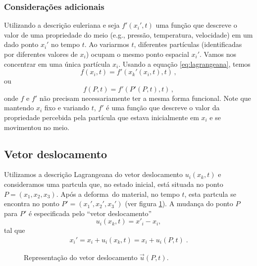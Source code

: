 \subsubsection{Considera\c{c}\~oes adicionais}
Utilizando a descri\c{c}\~ao euleriana e seja $f'(x_i',t)$ uma fun\c{c}\~ao que
descreve o valor de uma propriedade do meio (e.g., press\~ao, temperatura,
velocidade) em um dado ponto $x_i'$ no tempo $t$. Ao variarmos $t$,
diferentes part\'iculas (identificadas por diferentes valores de $x_i$) ocupam o
mesmo ponto espacial $x_i'$. Vamos nos concentrar em uma \'unica part\'icula
$x_i$. Usando a equa\c{c}\~ao \ref{eq:lagrangeana}, temos
\begin{equation}
  f(x_i,t) = f'(x_k'(x_i,t),t)\, ,
\end{equation}
ou
\begin{equation}
  f(P,t) = f'(P'(P,t),t)\, ,
\end{equation}
onde $f$ e $f'$ n\~ao precisam necessariamente ter a mesma forma funcional. Note
que mantendo $x_i$ fixo e variando $t$, $f'$ \'e uma fun\c{c}\~ao que descreve
o valor da propriedade percebida pela part\'icula que estava inicialmente em $x_i$
e se movimentou no meio.

\subsection{Vetor deslocamento}

Utilizamos a descri\c{c}\~ao Lagrangeana do 
vetor deslocamento $u_i(x_k,t)$ e consideramos uma part\ih cula que, no estado
inicial, est\'a situada no ponto $P=(x_1,x_2,x_3)$. Ap\'os a deforma\cao\
do material, no tempo $t$, esta part\ih cula se encontra
no ponto $P'=(x_1',x_2',x_3')$ (ver figura \ref{fig:vetor-deslocamento}).
A mudan\c{c}a do ponto $P$
para $P'$ \'e especificada pelo ``vetor deslocamento''
\begin{equation}
u_i(x_k , t)=x'_{i} - x_i ,
\end{equation}
tal que
\begin{eqnarray}
x_i' = x_i + u_i(x_k,t) = x_i + u_i(P,t) \; .
\label{eq:pos-deformacao}
\end{eqnarray}

\begin{figure}[!tb]
\centering
{}
\caption{Representa\c{c}\~ao do vetor deslocamento $\vec{u}(P,t)$.}
\label{fig:vetor-deslocamento}
\end{figure}


